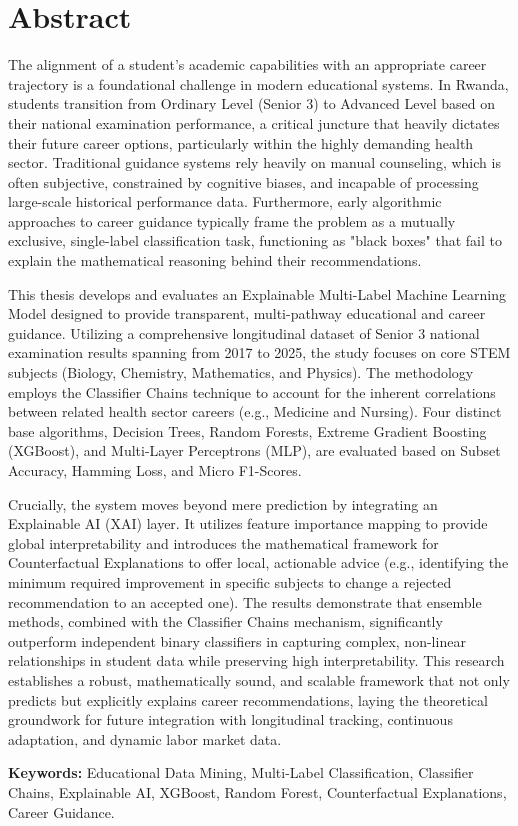 \section*{Abstract}

The alignment of a student's academic capabilities with an appropriate career trajectory is a foundational challenge in modern educational systems. In Rwanda, students transition from Ordinary Level (Senior 3) to Advanced Level based on their national examination performance, a critical juncture that heavily dictates their future career options, particularly within the highly demanding health sector. Traditional guidance systems rely heavily on manual counseling, which is often subjective, constrained by cognitive biases, and incapable of processing large-scale historical performance data. Furthermore, early algorithmic approaches to career guidance typically frame the problem as a mutually exclusive, single-label classification task, functioning as "black boxes" that fail to explain the mathematical reasoning behind their recommendations. 

This thesis develops and evaluates an Explainable Multi-Label Machine Learning Model designed to provide transparent, multi-pathway educational and career guidance. Utilizing a comprehensive longitudinal dataset of Senior 3 national examination results spanning from 2017 to 2025, the study focuses on core STEM subjects (Biology, Chemistry, Mathematics, and Physics). The methodology employs the Classifier Chains technique to account for the inherent correlations between related health sector careers (e.g., Medicine and Nursing). Four distinct base algorithms, Decision Trees, Random Forests, Extreme Gradient Boosting (XGBoost), and Multi-Layer Perceptrons (MLP), are evaluated based on Subset Accuracy, Hamming Loss, and Micro F1-Scores. 

Crucially, the system moves beyond mere prediction by integrating an Explainable AI (XAI) layer. It utilizes feature importance mapping to provide global interpretability and introduces the mathematical framework for Counterfactual Explanations to offer local, actionable advice (e.g., identifying the minimum required improvement in specific subjects to change a rejected recommendation to an accepted one). The results demonstrate that ensemble methods, combined with the Classifier Chains mechanism, significantly outperform independent binary classifiers in capturing complex, non-linear relationships in student data while preserving high interpretability. This research establishes a robust, mathematically sound, and scalable framework that not only predicts but explicitly explains career recommendations, laying the theoretical groundwork for future integration with longitudinal tracking, continuous adaptation, and dynamic labor market data.

\vspace{1cm}
\textbf{Keywords:} Educational Data Mining, Multi-Label Classification, Classifier Chains, Explainable AI, XGBoost, Random Forest, Counterfactual Explanations, Career Guidance.
